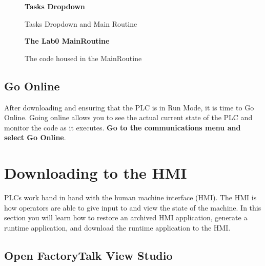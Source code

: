 
\begin{figure}[h]
\centering
\textbf{Tasks Dropdown}\par \medskip
{}
\caption{Tasks Dropdown and Main Routine}
\label{fig:MainRoutine}
\end{figure}


\begin{figure}[h]
\centering
\textbf{The Lab0 MainRoutine}\par \medskip
{}
\caption{The code housed in the MainRoutine}
\label{fig:TheCode}
\end{figure}


\subsection{Go Online}
\label{subsection:GoOnline}

After downloading and ensuring that the PLC is in Run Mode, it is time to Go Online. Going online allows you to see the actual current state of the PLC and monitor the code as it executes. \textbf{Go to the communications menu and select Go Online}.


\TASignatureSlot


\section{Downloading to the HMI}

PLCs work hand in hand with the human machine interface (HMI). The HMI is how operators are able to give input to and view the state of the machine. In this section you will learn how to restore an archived HMI application, generate a runtime application, and download the runtime application to the HMI.

\subsection{Open FactoryTalk View Studio}

